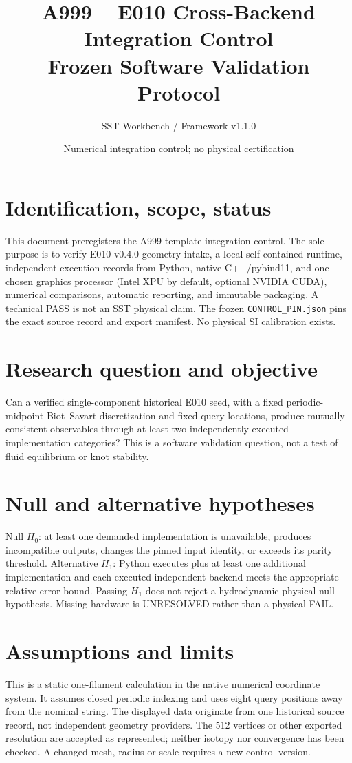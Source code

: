 \documentclass[11pt,a4paper]{article}
\title{A999 -- E010 Cross-Backend Integration Control\\Frozen Software Validation Protocol}
\author{SST-Workbench / Framework v1.1.0}
\date{Numerical integration control; no physical certification}
\begin{document}
\maketitle
\section{Identification, scope, status}
This document preregisters the A999 template-integration control. The sole purpose is to verify E010 v0.4.0 geometry intake, a local self-contained runtime, independent execution records from Python, native C++/pybind11, and one chosen graphics processor (Intel XPU by default, optional NVIDIA CUDA), numerical comparisons, automatic reporting, and immutable packaging. A technical PASS is not an SST physical claim. The frozen \texttt{CONTROL\_PIN.json} pins the exact source record and export manifest. No physical SI calibration exists.
\section{Research question and objective}
Can a verified single-component historical E010 seed, with a fixed periodic-midpoint Biot--Savart discretization and fixed query locations, produce mutually consistent observables through at least two independently executed implementation categories? This is a software validation question, not a test of fluid equilibrium or knot stability.
\section{Null and alternative hypotheses}
Null $H_0$: at least one demanded implementation is unavailable, produces incompatible outputs, changes the pinned input identity, or exceeds its parity threshold. Alternative $H_1$: Python executes plus at least one additional implementation and each executed independent backend meets the appropriate relative error bound. Passing $H_1$ does not reject a hydrodynamic physical null hypothesis. Missing hardware is UNRESOLVED rather than a physical FAIL.
\section{Assumptions and limits}
This is a static one-filament calculation in the native numerical coordinate system. It assumes closed periodic indexing and uses eight query positions away from the nominal string. The displayed data originate from one historical source record, not independent geometry providers. The 512 vertices or other exported resolution are accepted as represented; neither isotopy nor convergence has been checked. A changed mesh, radius or scale requires a new control version.
\end{document}
